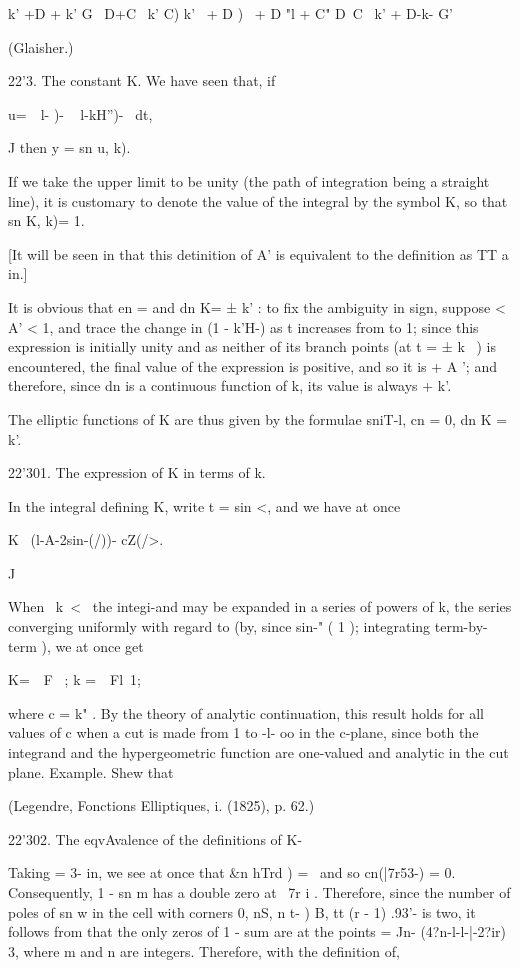k' +D + k' G \ D+C \ k' C) k' \ + D ) \ + D "l + C" D~C ~k' + D-k- G'

(Glaisher.)

22'3. The constant K. We have seen that, if

u=\ \ l- )- ~ l-kH'')- ~dt,

J then y = sn u, k).

If we take the upper limit to be unity (the path of integration being
a straight line), it is customary to denote the value of the integral
by the symbol K, so that sn K, k)= 1.

[It will be seen in that this detinition of A' is equivalent
to the definition as TT a in.]

%
%

It is obvious that en = and dn K= ± k' : to fix the ambiguity in sign,
suppose < A' < 1, and trace the change in (1 - k'H-) as t increases
from to 1; since this expression is initially unity and as neither of
its branch points (at t = ± k~ ) is encountered, the final value of
the expression is positive, and so it is + A '; and therefore, since
dn is a continuous function of k, its value is always + k'.

The elliptic functions of K are thus given by the formulae sniT-l, cn
= 0, dn K = k'.

22'301. The expression of K in terms of k.

In the integral defining K, write t = sin <, and we have at once

K \ (l-A-2sin-(/))- cZ(/>.

J

When \ k\ < \, the integi-and may be expanded in a series of powers of
k, the series converging uniformly with regard to (by, since
sin-" ( 1 ); integrating term-by-term ), we at once get

K=\ \ F \, ; k =\ \ Fl\, 1;

where c = k" . By the theory of analytic continuation, this result
holds for all values of c when a cut is made from 1 to -l- oo in the
c-plane, since both the integrand and the hypergeometric function are
one-valued and analytic in the cut plane. Example. Shew that

(Legendre, Fonctions Elliptiques, i. (1825), p. 62.)

22'302. The eqvAvalence of the definitions of K-

Taking = 3- in, we see at once that \&n hTrd ) = \ and so
cn(|7r53-) = 0. Consequently, 1 - sn m has a double zero at \ 7r i .
Therefore, since the number of poles of sn w in the cell with corners
0, nS, n t- ) B, tt (r - 1) .93'- is two, it follows from
that the only zeros of 1 - sum are at the points = Jn-
(4?n-l-l-|-2?ir) 3, where m and n are integers. Therefore, with the
definition of,

